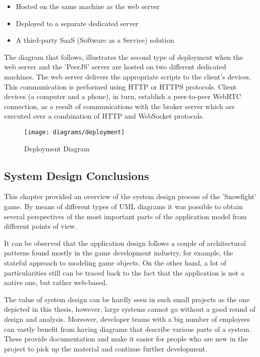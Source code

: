 \begin{itemize}
	\item Hosted on the same machine as the web server
	\item Deployed to a separate dedicated server
	\item A third-party SaaS (Software as a Service) solution
\end{itemize}

The diagram that follows, illustrates the second type of deployment when the web
server and the 'PeerJS' server are hosted on two different dedicated machines.
The web server delivers the appropriate scripts to the client's devices. This
communication is performed using HTTP or HTTPS protocols. Client devices (a
computer and a phone), in turn, establish a peer-to-peer WebRTC connection, as a
result of communications with the broker server which are executed over a
combination of HTTP and WebSocket protocols.

\begin{figure}[!h]
\centering
\texttt{[image: diagrams/deployment]}
\caption{Deployment Diagram}\label{diag:deployment}
\end{figure}

\newpage

\subsection{System Design Conclusions}

This chapter provided an overview of the system design process of the
'Snowfight' game. By means of different types of UML diagrams it was possible to
obtain several perspectives of the most important parts of the application model
from different points of view.

It can be observed that the application design follows a couple of architectural
patterns found mostly in the game development industry, for example, the
stateful approach to modeling game objects. On the other hand, a lot of
particularities still can be traced back to the fact that the application is not
a native one, but rather web-based.

The value of system design can be hardly seen in such small projects as the one
depicted in this thesis, however, large systems cannot go without a good round
of design and analysis. Moreover, developer teams with a big number of employees
can vastly benefit from having diagrams that describe various parts of a system.
These provide documentation and make it easier for people who are new in the
project to pick up the material and continue further development.

\clearpage

